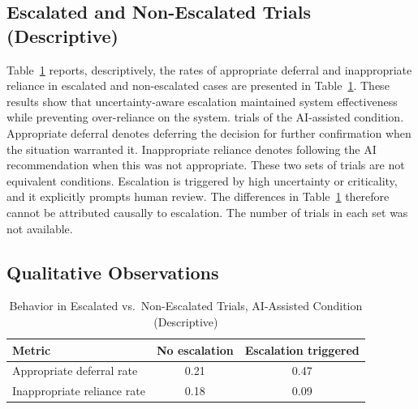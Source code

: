 \documentclass[journal]{IEEEtran}
\theoremstyle{plain}
\theoremstyle{definition}
\providecommand{\DIFaddtex}[1]{{\protect\color{blue} \sf #1}} %
\providecommand{\DIFdeltex}[1]{{\protect\color{red} \scriptsize #1}} %
\providecommand{\DIFaddbegin}{} %
\providecommand{\DIFaddend}{} %
\providecommand{\DIFdelbegin}{} %
\providecommand{\DIFdelend}{} %
\providecommand{\DIFadd}[1]{\texorpdfstring{\DIFaddtex{#1}}{#1}} %
\providecommand{\DIFdel}[1]{\texorpdfstring{\DIFdeltex{#1}}{}} %
\newcommand{\DIFscaledelfig}{0.5}
\newlength{\DIFdelgraphicswidth} %
\newlength{\DIFdelgraphicsheight} %
\newcommand{\DIFaddincludegraphics}[2][]{{\color{blue}\fbox{\DIFOincludegraphics[#1]{#2}}}} %
\newcommand{\DIFdelincludegraphics}[2][]{%
\sbox{\DIFdelgraphicsbox}{\DIFOincludegraphics[#1]{#2}}%
\settoboxwidth{\DIFdelgraphicswidth}{\DIFdelgraphicsbox} %
\settoboxtotalheight{\DIFdelgraphicsheight}{\DIFdelgraphicsbox} %
\scalebox{\DIFscaledelfig}{%
\parbox[b]{\DIFdelgraphicswidth}{\usebox{\DIFdelgraphicsbox}\\[-\baselineskip] \rule{\DIFdelgraphicswidth}{0em}}\llap{\resizebox{\DIFdelgraphicswidth}{\DIFdelgraphicsheight}{%
\setlength{\unitlength}{\DIFdelgraphicswidth}%
\begin{picture}(1,1)%
\thicklines\linethickness{2pt} %
{\color[rgb]{1,0,0}\put(0,0){\framebox(1,1){}}}%
{\color[rgb]{1,0,0}\put(0,0){\line( 1,1){1}}}%
{\color[rgb]{1,0,0}\put(0,1){\line(1,-1){1}}}%
\end{picture}%
}\hspace*{3pt}}} %
} %
\DeclareRobustCommand{\DIFaddbegin}{\DIFOaddbegin \let\includegraphics\DIFaddincludegraphics} %
\DeclareRobustCommand{\DIFaddend}{\DIFOaddend \let\includegraphics\DIFOincludegraphics} %
\DeclareRobustCommand{\DIFdelbegin}{\DIFOdelbegin \let\includegraphics\DIFdelincludegraphics} %
\DeclareRobustCommand{\DIFdelend}{\DIFOaddend \let\includegraphics\DIFOincludegraphics} %
\begin{document}
    \subsection{\DIFadd{Escalated and Non-Escalated Trials (Descriptive)}}
    \label{sec:res_escalation}
    \DIFadd{Table~\ref{tab:escalation} reports, descriptively, the rates of appropriate deferral and inappropriate reliance in }\DIFaddend escalated and non-escalated \DIFdelbegin \DIFdel{cases are presented in Table~\ref{tab:escalation}. These results show that uncertainty-aware escalation maintained system effectiveness while preventing over-reliance on the system. }\DIFdelend \DIFaddbegin \DIFadd{trials of the AI-assisted condition. Appropriate deferral denotes deferring the decision for further confirmation when the situation warranted it. Inappropriate reliance denotes following the AI recommendation when this was not appropriate. These two sets of trials are not equivalent conditions. Escalation is triggered by high uncertainty or criticality, and it explicitly prompts human review. The differences in Table~\ref{tab:escalation} therefore cannot be attributed causally to escalation. The number of trials in each set was not available.
}\DIFaddend 

    \DIFdelbegin \subsection{\DIFdel{Qualitative Observations}}
\addtocounter{subsection}{-1}%
\DIFdelend \DIFaddbegin \begin{table}[t]
        \caption{Behavior in Escalated vs.\ Non-Escalated Trials, AI-Assisted Condition (Descriptive)}
        \label{tab:escalation}
        \centering
        \begin{tabular}{lcc}
            \toprule
            \textbf{Metric} & \textbf{No escalation} & \textbf{Escalation triggered} \\
            \midrule
            Appropriate deferral rate & 0.21 & 0.47 \\
            Inappropriate reliance rate & 0.18 & 0.09 \\
            \bottomrule
        \end{tabular}
    \end{table}
\DIFaddend 
\end{document}
